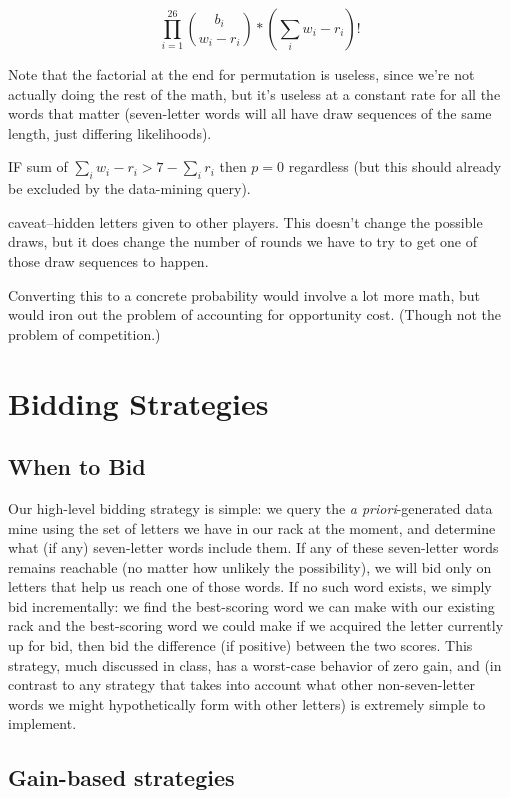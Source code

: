 \documentclass[11pt]{article}
\begin{document}
$$\prod_{i=1}^{26}{b_{i}\choose w_{i} - r_{i}}*\left( \sum_{i}w_{i} - r_{i}\right)!$$

Note that the factorial at the end for permutation is useless, since we're not actually doing the rest of the math, but it's useless at a constant rate for all the words that matter (seven-letter words will all have draw sequences of the same length, just differing likelihoods).

IF sum of $ \sum_{i}w_{i} - r_{i} > 7 - \sum_{i} r_{i}$ then $p = 0$ regardless (but this should already be excluded by the data-mining query).

caveat--hidden letters given to other players.  This doesn't change the possible draws, but it does change the number of rounds we have to try to get one of those draw sequences to happen.

Converting this to a concrete probability would involve a lot more math, but would iron out the problem of accounting for opportunity cost.  (Though not the problem of competition.)

\section{Bidding Strategies}

\subsection{When to Bid}

Our high-level bidding strategy is simple: we query the {\it a priori}-generated data mine using the set of letters we have in our rack at the moment, and determine what (if any) seven-letter words include them.  If any of these seven-letter words remains reachable (no matter how unlikely the possibility), we will bid only on letters that help us reach one of those words.
If no such word exists, we simply bid incrementally: we find the best-scoring word we can make with our existing rack and the best-scoring word we could make if we acquired the letter currently up for bid, then bid the difference (if positive) between the two scores.  This strategy, much discussed in class, has a worst-case behavior of zero gain, and (in contrast to any strategy that takes into account what other non-seven-letter words we might hypothetically form with other letters) is extremely simple to implement.

\subsection{Gain-based strategies}
\end{document}
